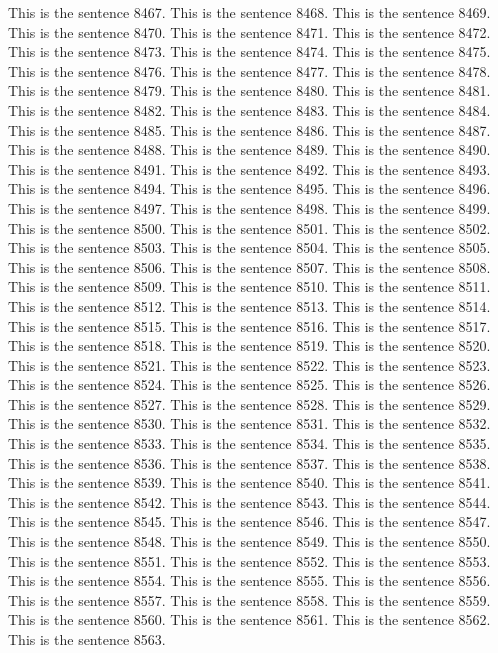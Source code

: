 \documentclass{article}
\begin{document}
This is the sentence 8467.
This is the sentence 8468.
This is the sentence 8469.
This is the sentence 8470.
This is the sentence 8471.
This is the sentence 8472.
This is the sentence 8473.
This is the sentence 8474.
This is the sentence 8475.
This is the sentence 8476.
This is the sentence 8477.
This is the sentence 8478.
This is the sentence 8479.
This is the sentence 8480.
This is the sentence 8481.
This is the sentence 8482.
This is the sentence 8483.
This is the sentence 8484.
This is the sentence 8485.
This is the sentence 8486.
This is the sentence 8487.
This is the sentence 8488.
This is the sentence 8489.
This is the sentence 8490.
This is the sentence 8491.
This is the sentence 8492.
This is the sentence 8493.
This is the sentence 8494.
This is the sentence 8495.
This is the sentence 8496.
This is the sentence 8497.
This is the sentence 8498.
This is the sentence 8499.
This is the sentence 8500.
This is the sentence 8501.
This is the sentence 8502.
This is the sentence 8503.
This is the sentence 8504.
This is the sentence 8505.
This is the sentence 8506.
This is the sentence 8507.
This is the sentence 8508.
This is the sentence 8509.
This is the sentence 8510.
This is the sentence 8511.
This is the sentence 8512.
This is the sentence 8513.
This is the sentence 8514.
This is the sentence 8515.
This is the sentence 8516.
This is the sentence 8517.
This is the sentence 8518.
This is the sentence 8519.
This is the sentence 8520.
This is the sentence 8521.
This is the sentence 8522.
This is the sentence 8523.
This is the sentence 8524.
This is the sentence 8525.
This is the sentence 8526.
This is the sentence 8527.
This is the sentence 8528.
This is the sentence 8529.
This is the sentence 8530.
This is the sentence 8531.
This is the sentence 8532.
This is the sentence 8533.
This is the sentence 8534.
This is the sentence 8535.
This is the sentence 8536.
This is the sentence 8537.
This is the sentence 8538.
This is the sentence 8539.
This is the sentence 8540.
This is the sentence 8541.
This is the sentence 8542.
This is the sentence 8543.
This is the sentence 8544.
This is the sentence 8545.
This is the sentence 8546.
This is the sentence 8547.
This is the sentence 8548.
This is the sentence 8549.
This is the sentence 8550.
This is the sentence 8551.
This is the sentence 8552.
This is the sentence 8553.
This is the sentence 8554.
This is the sentence 8555.
This is the sentence 8556.
This is the sentence 8557.
This is the sentence 8558.
This is the sentence 8559.
This is the sentence 8560.
This is the sentence 8561.
This is the sentence 8562.
This is the sentence 8563.
\end{document}
